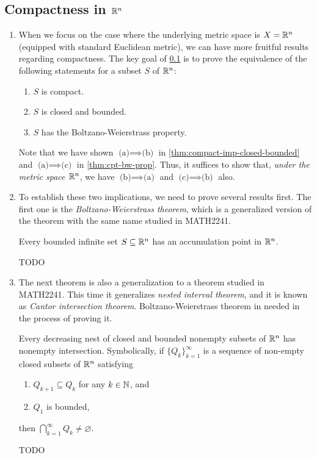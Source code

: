 \subsection{Compactness in \(\mathbb{R}^n\)}
\label{subsect:compactness-rn}
\begin{enumerate}
\item When we focus on the case where the underlying metric space is \(X=\mathbb{R}^n\)
(equipped with standard Euclidean metric), we can have more fruitful results
regarding compactness. The key goal of \cref{subsect:compactness-rn} is to
prove the equivalence of the following statements for a subset \(S\) of
\(\mathbb{R}^n\):
\begin{enumerate}
\item \(S\) is compact.
\item \(S\) is closed and bounded.
\item \(S\) has the Boltzano-Weierstrass property.
\end{enumerate}
Note that we have shown \(\text{(a)}\implies \text{(b)}\) in
\cref{thm:compact-imp-closed-bounded} and \(\text{(a)}\implies \text{(c)}\) in
\cref{thm:cpt-bw-prop}. Thus, it suffices to show that, \emph{under the metric
space \(\mathbb{R}^n\)}, we have \(\text{(b)}\implies \text{(a)}\) and
\(\text{(c)}\implies \text{(b)}\) also.

\item To establish these two implications, we need to prove several results
first. The first one is the \emph{Boltzano-Weierstrass theorem}, which is a
generalized version of the theorem with the same name studied in MATH2241.

\begin{theorem}
\label{thm:boltzano-weierstrass}
Every bounded infinite set \(S\subseteq \mathbb{R}^n\) has an accumulation point in
\(\mathbb{R}^n\).
\end{theorem}
\begin{pf}
TODO
\end{pf}


\item The next theorem is also a generalization to a theorem studied in
MATH2241. This time it generalizes \emph{nested interval theorem}, and it is
known as \emph{Cantor intersection theorem}. Boltzano-Weierstrass theorem in
needed in the process of proving it.
\begin{theorem}
\label{thm:cantor-intersection}
Every decreasing nest of closed and bounded nonempty subsets of \(\mathbb{R}^n\) has
nonempty intersection. Symbolically, if \(\{Q_k\}_{k=1}^{\infty}\) is a
sequence of non-empty closed subsets of \(\mathbb{R}^n\) satisfying
\begin{enumerate}
\item \(Q_{k+1}\subseteq Q_k\) for any \(k\in\mathbb{N}\), and
\item \(Q_1\) is bounded,
\end{enumerate}
then \(\displaystyle \bigcap_{k=1}^{\infty}Q_k\ne\varnothing\).
\end{theorem}
\begin{pf}
TODO
\end{pf}


\end{enumerate}
